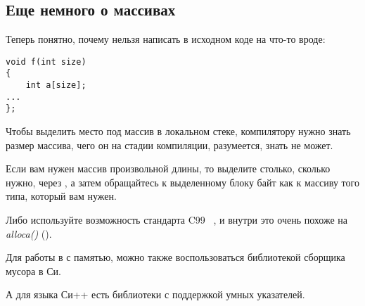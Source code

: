 \subsection{Еще немного о массивах}

Теперь понятно, почему нельзя написать в исходном коде на \CCpp что-то вроде:


\begin{lstlisting}[style=customc]
void f(int size)
{
    int a[size];
...
};
\end{lstlisting}

Чтобы выделить место под массив в локальном стеке, 
компилятору нужно знать размер массива, чего он на стадии компиляции, 
разумеется, знать не может.


Если вам нужен массив произвольной длины, то выделите столько, сколько нужно, через , 
а затем обращайтесь к выделенному блоку байт как к массиву того типа, который вам нужен.


Либо используйте возможность стандарта C99~ ,
и внутри это очень похоже на \emph{alloca()} ().


Для работы в с памятью, можно также воспользоваться библиотекой сборщика мусора в Си.

А для языка Си++ есть библиотеки с поддержкой умных указателей.


